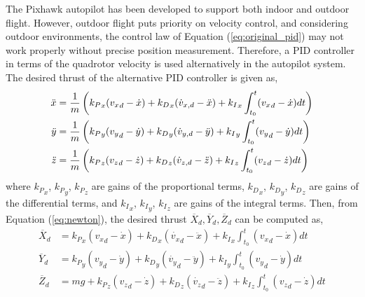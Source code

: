 The Pixhawk autopilot has been developed to support both indoor and outdoor flight. However, outdoor flight puts priority on velocity control, and considering outdoor environments, the control law of Equation (\ref{eq:original_pid}) may not work properly without precise position measurement. Therefore, a PID controller in terms of the quadrotor velocity is used alternatively in the autopilot system. The desired thrust of the alternative PID controller is given as,\\
\begin{equation}
\begin{aligned}
\ddot{x}  & = {1 \over m} \left( {{k_P}_x}({v_x}_d - \dot{ x} ) + {{k_D}_x}({\dot {v}_{x,d}} -\ddot{ x} ) + {{k_I }_x} \int_{t_0}^{t}({{v_x}_d - \dot{ x} }) dt \right)\\
\ddot{y}  & = {1 \over m} \left( {{k_P}_y}({v_y}_d - \dot{ y} ) + {{k_D}_y}({\dot {v}_{y,d}} -\ddot{ y} ) + {{k_I }_y} \int_{t_0}^{t}({{v_y}_d - \dot{ y} }) dt \right)\\
\ddot{z}  & = {1 \over m} \left( {{k_P}_z}({v_z}_d - \dot{ z} ) + {{k_D}_z}({\dot {v}_{z,d}} -\ddot{ z} ) + {{k_I }_z} \int_{t_0}^{t}({{v_z}_d - \dot{ z} }) dt \right)\\
\end{aligned}
\end{equation}
where \({{k_{P}}_x}\), \({{k_{P}}_y}\), \({{k_{P}}_z}\) are gains of the proportional terms, \({{k_{D}}_x}\), \({{k_{D}}_y}\), \({{k_{D}}_z}\) are gains of the differential terms, and \({{k_{I}}_x}\), \({{k_{I}}_y}\), \({{k_{I}}_z}\) are gains of the integral terms. Then, from Equation (\ref{eq:newton}), the desired thrust \({\overline X}_d, {\overline Y}_d, {\overline Z}_d \) can be computed as,
\begin{equation}
\label{eq:desired_thrust_vector}
\begin{aligned}
{\overline X}_d & = {{k_P}_x}({v_x}_d - \dot{ x} ) + {{k_D}_x}({\dot {v_x}_d} -\ddot{ x} ) + {{k_I }_x} \int_{t_0}^{t}({{v_x}_d - \dot{ x} }) dt\\
{\overline Y}_d & = {{k_P}_y}({v_y}_d - \dot{ y} ) + {{k_D}_y}({\dot {v_y}_d} -\ddot{ y} ) + {{k_I }_y} \int_{t_0}^{t}({{v_y}_d - \dot{ y} }) dt\\
{\overline Z}_d & = m g + {{k_P}_z}({v_z}_d - \dot{ z} ) + {{k_D}_z}({\dot {v_z}_d} -\ddot{ z} ) + {{k_I }_z} \int_{t_0}^{t}({{v_z}_d - \dot{ z} }) dt\\
\end{aligned}
\end{equation}

